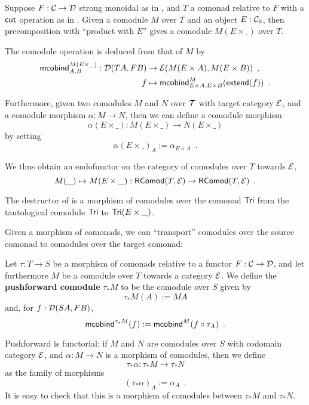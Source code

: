\documentclass{amsart}
\newcommand{\fat}[1]{\textbf{#1}}
\begin{document}
\begin{definition}\label{def:product_in_context}
 Suppose $F:\C\to\D$ strong monoidal as in , and $T$ a comonad relative to $F$ with a $\cut$ operation 
 as in .
 Given a comodule $M$ over $T$ and an object $E:\C_0$, then precomposition with \enquote{product with $E$}
 gives a comodule $M(E\times\_)$ over $T$.
 
 The comodule operation is deduced from that of $M$ by 
 \begin{align*} \mcobind^{M(E\times\_)}_{A,B} : \D(TA,FB)&\to \E(M(E\times A), M(E\times B)) \enspace ,\\
                                                      f &\mapsto \mcobind^M_{E\times A,E\times B}(\extend(f)) \enspace .
  \end{align*}                                        

 \noindent
 Furthermore, given two comodules $M$ and $N$ over $\T$ with target category $\E$, and a comodule morphism $\alpha : M \to N$, then 
 we can define a comodule morphism \[\alpha(E\times \_) : M(E\times \_) \to N(E\times \_) \] by setting
          \[ \alpha(E \times \_)_A := \alpha_{E\times A} \enspace . \]
  
  \noindent
  We thus obtain an endofunctor on the category of comodules over $T$ towards $\E$,
   \[ M(\_) \mapsto  M (E\times \_) : \RComod(T,\E) \to \RComod(T,\E) \enspace . \]
 

\end{definition}






\begin{example}\label{ex:tail_comodule}
 The destructor \constfont{\tail} of  is a morphism of comodules over the comonad $\Tri$ 
  from the tautological comodule  $\Tri$ to $\Tri(E\times \_)$.
\end{example}





Given a morphism of comonads, we can \enquote{transport} comodules over the source comonad to comodules over the target comonad:


\begin{definition}\label{def:pushforward_comodule}
  Let $\tau : T\to S$ be a morphism of comonads relative to a functor $F : \C \to \D$, and let furthermore $M$ be a 
  comodule over $T$ towards a category $\E$. We define the \fat{pushforward comodule} $\tau_*M$ to be the comodule over $S$ given by
  \[  \tau_*M(A) := MA \]
  and, for $f : \D(SA,FB)$,
   \[ \mcobind^{\tau_*M}(f) := \mcobind^M(\comp{\tau_A}{f}) \enspace . \]
   
  \noindent
  Pushforward is functorial: if $M$ and $N$ are comodules over $S$ with codomain category $\E$, and $\alpha : M\to N$ is 
    a morphism of comodules, then we define \[\tau_*\alpha : \tau_*M \to \tau_*N\] 
    as the family of morphisms
     \[ (\tau_*\alpha)_A := \alpha_A \enspace . \]
  It is easy to check that this is a morphism of comodules between $\tau_*M$ and $\tau_*N$.
\end{definition}
\end{document}
